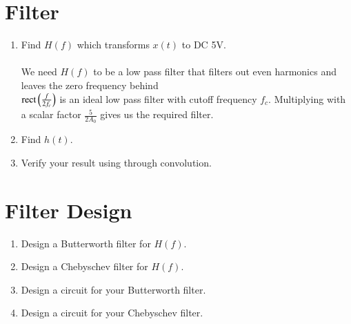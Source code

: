 \documentclass[journal,12pt,twocolumn]{IEEEtran}
\renewcommand\thesection{\arabic{section}}
\begin{document}
\section{Filter}
\begin{enumerate}[label=\thesection.\arabic*, ref=\thesection.\theenumi]


\item Find $H(f)$ which transforms $x(t)$ to DC 5V. \\
	\solution \\
	We need \( H(f) \) to be a low pass filter that filters out even harmonics and leaves the
	zero frequency behind \\
	\( \text{rect}\left(\frac{f}{2f_c}\right) \) is an ideal low pass filter with cutoff frequency \( f_c \).
	Multiplying with a scalar factor \( \displaystyle \frac{5}{2A_0} \) gives us the required filter. \\

\item Find $h(t)$.


\item Verify your result using  through convolution.


\end{enumerate}



\section{Filter Design}

\begin{enumerate}[label=\thesection.\arabic*, ref=\thesection.\theenumi]


\item Design a Butterworth filter for $H(f)$.


\item Design a Chebyschev filter for $H(f)$.


\item Design a circuit for your Butterworth filter.


\item Design a circuit for your Chebyschev filter.


\end{enumerate}
\end{document}

